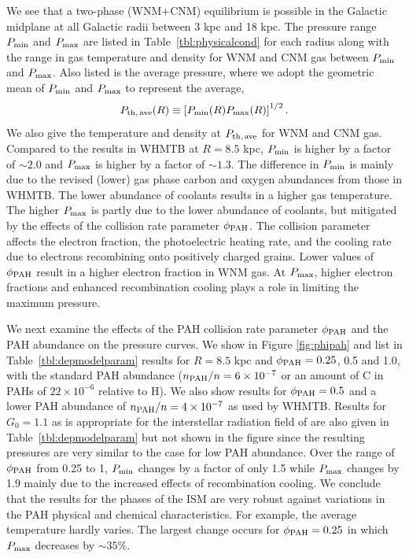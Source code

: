 \documentclass[12pt,preprint,flushrt]{aastex}
\newcommand{\beq}{\begin{equation}}
\newcommand{\eeq}{\end{equation}}
\newcommand{\pmax}{P_{\rm max}}
\newcommand{\pmin}{P_{\rm min}}
\begin{document}
We see that a two-phase (WNM+CNM) equilibrium is
possible
in the Galactic midplane at all Galactic radii between 3 kpc and 18 kpc.
The pressure
range $P_{\rm min}$ and $P_{\rm max}$ are listed in 
Table~\ref{tbl:physicalcond} for
each radius along with the range
in gas temperature and density for WNM and CNM gas between $P_{\rm min}$
and $P_{\rm max}$.
Also listed is the average pressure, where we adopt the
geometric mean of $\pmin$ and $\pmax$ to represent the average,
\beq
P_{\rm th,\,ave}(R) \equiv \left[P_{\rm min}(R) P_{\rm max}(R)\right]^{1/2}.
\label{eq:pthave}
\eeq
We also give the temperature and density at $P_{\rm th,\,ave}$ for WNM and
CNM gas.
Compared to the results in WHMTB at
$R=8.5$ kpc, $P_{\rm min}$  is higher by a factor of $\sim 2.0$ and  
$P_{\rm max}$ is higher by a factor of 
$\sim 1.3$. The difference in $\pmin$ is mainly due to the revised
(lower) gas phase carbon and oxygen abundances from those in WHMTB. The
lower abundance of coolants results in a higher gas temperature. 
The higher $\pmax$ is partly due to the lower abundance of coolants,
but mitigated by the effects of the collision rate parameter
$\phi_{\rm PAH}$. The collision parameter affects the electron fraction,
the photoelectric heating rate, and the cooling rate due to electrons
recombining onto positively charged grains. Lower values of
$\phi_{\rm PAH}$ result in a higher electron fraction in WNM gas.
At $\pmax$,
higher electron fractions and enhanced recombination cooling plays 
a role in limiting the maximum pressure.

We next examine the effects of the PAH collision rate parameter
$\phi_{\rm PAH}$ and the PAH abundance on the pressure curves.
We show in Figure \ref{fig:phipah} and list in
Table~\ref{tbl:depmodelparam} results for $R= 8.5$ kpc and 
$\phi_{\rm PAH} = 0.25$, 0.5 and 1.0,
with the standard PAH abundance ($n_{\rm PAH}/n=6\times 10^{-7}$ or
an amount of C in PAHs of $22\times 10^{-6}$ relative to H). We
also show results for $\phi_{\rm PAH} = 0.5$ and a lower PAH abundance of
$n_{\rm PAH}/n = 4\times 10^{-7}$ as used by WHMTB.  
Results for $G_0=1.1$ as is appropriate
for the interstellar radiation field of \cite{mat83} are also given
in Table~\ref{tbl:depmodelparam} but not shown in the figure since the
resulting pressures are very similar to the case for  low PAH abundance. 
Over the range of
$\phi_{\rm PAH}$ from 0.25 to 1, $P_{\rm min}$ changes by a factor of only
1.5 while $P_{\rm max}$ changes by 1.9 mainly due to the increased
effects of recombination cooling. 
We conclude that the results for the phases of
the ISM are very robust against variations in the PAH physical 
and chemical characteristics. For example, the average temperature
hardly varies. The largest change occurs for $\phi_{\rm PAH} =0.25$
in which $\pmax$ decreases by $\sim 35$\%.
\end{document}
